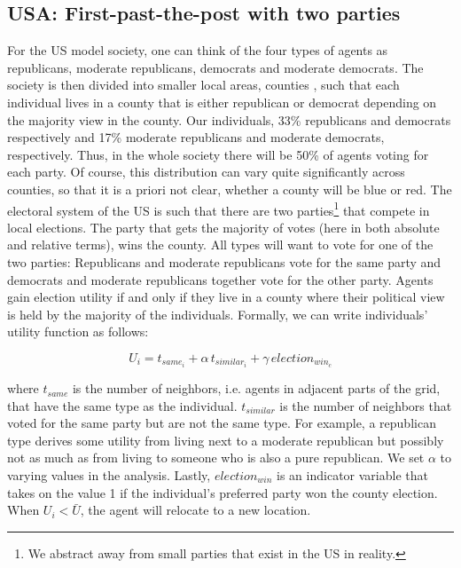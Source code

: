 \documentclass[12pt, a4paper]{article}
\begin{document}
\subsection{USA: First-past-the-post with two parties}
For the US model society, one can think of the four types of agents as republicans, moderate republicans, democrats and moderate democrats. The society is then divided into smaller local areas, counties 
, such that each individual lives in a county that is either republican or democrat depending on the majority view in the county. Our individuals, 33\% republicans and democrats respectively and 17\% moderate republicans and moderate democrats, respectively. %
Thus, in the whole society there will be 50\% of agents voting for each party. Of course, this distribution can vary quite significantly across counties, so that it is a priori not clear, whether a county will be blue or red.
The electoral system of the US is such that there are two parties\footnote{We abstract away from small parties that exist in the US in reality.} that compete in local elections. The party that gets the majority of votes (here in both absolute and relative terms), wins the county. All types will want to vote for one of the two parties: Republicans and moderate republicans vote for the same party and democrats and moderate republicans together vote for the other party. Agents gain election utility if and only if they live in a county where their political view is held by the majority of the individuals.  Formally, we can write individuals' utility function as follows:


\begin{equation}
U_i=t_{same_i}+\alpha \, t_{similar_i}+\gamma \, election_{win_c}
\end{equation}

where $t_{same}$ is the number of neighbors, i.e. agents in adjacent parts of the grid, that have the same type as the individual. $t_{similar}$ is the number of neighbors that voted for the same party but are not the same type. For example, a republican type derives some utility from living next to a moderate republican but possibly not as much as from living to someone who is also a pure republican. We set $\alpha$ to varying values in the analysis. Lastly, $election_{win}$ is an indicator variable that takes on the value 1 if the individual's preferred party won the county election. When $U_i < \bar{U}$, the agent will relocate to a new location.
\end{document}
